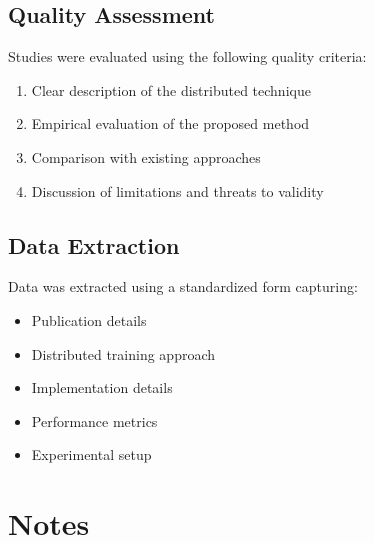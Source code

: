 \subsection{Quality Assessment}
Studies were evaluated using the following quality criteria:
\begin{enumerate}
    \item Clear description of the distributed technique
    \item Empirical evaluation of the proposed method
    \item Comparison with existing approaches
    \item Discussion of limitations and threats to validity
\end{enumerate}

\subsection{Data Extraction}
Data was extracted using a standardized form capturing:
\begin{itemize}
    \item Publication details
    \item Distributed training approach
    \item Implementation details
    \item Performance metrics
    \item Experimental setup
\end{itemize} 


\section{Notes}


